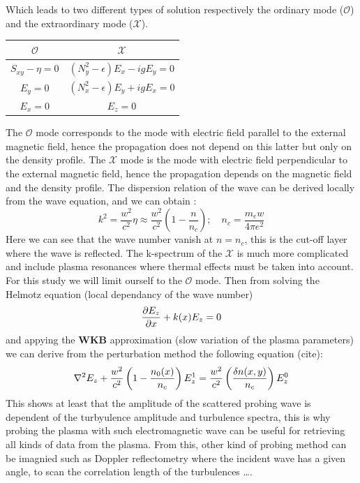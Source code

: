 \documentclass[11pt,a4paper]{report}
\begin{document}
\begin{multicols}{2}
    Which leads to two different types of solution respectively the ordinary mode ($\mathcal{O}$) and the extraordinary mode ($\mathcal{X}$).
    \setlength{\tabcolsep}{18pt}
    \renewcommand{\arraystretch}{1.5}
    \begin{center}
        \begin{tabular}{|| c  | c||}
            \hline
            $\mathcal{O}$       & $\mathcal{X}$                       \\
            \hline\hline
            $S_{xy} - \eta = 0$ & $(N_y^2 - \epsilon)E_x - igE_y = 0$ \\
            $E_y = 0$           & $(N_x^2 - \epsilon)E_y + igE_x = 0$ \\
            $E_x = 0$           & $E_z = 0$                           \\
            \hline
        \end{tabular}
    \end{center}
    The $\mathcal{O}$ mode corresponds to the mode with electric field parallel to the external magnetic field, hence the propagation does not depend on this latter but only on the density profile. The $\mathcal{X}$ mode is the mode with electric field perpendicular to the external magnetic field, hence the propagation depends on the magnetic field and the density profile. The dispersion relation of the wave can be derived locally from the wave equation, and we can obtain :
    $$k^2 = \frac{w^2}{c^2} \eta \approx \frac{w^2}{c^2}\left(1 - \frac{n}{n_c}\right); \quad n_c = \frac{m_ew}{4 \pi e^2} $$
    Here we can see that the wave number vanish at $n = n_c$, this is the cut-off layer where the wave is reflected.
    The k-spectrum of the $\mathcal{X}$ is much more complicated and include plasma resonances where thermal effects must be taken into account. For this study we will limit ourself to the $\mathcal{O}$ mode. Then from solving the Helmotz equation (local dependancy of the wave number) $$\pdv{E_z}{x} + k(x)E_z = 0$$ and appying the \textbf{WKB} approximation (slow variation of the plasma parameters) we can derive from the perturbation method the following equation (cite):
    $$ \laplacian E_z  + \frac{w^2}{c^2}\left(1 - \frac{n_0(x)}{n_c}\right)E^1_z =  \frac{w^2}{c^2}\left(\frac{\delta n(x,y)}{n_c}\right)E^0_z $$
    This shows at least that the amplitude of the scattered probing wave is dependent of the turbyulence amplitude and turbulence spectra, this is why probing the plasma with such electromagnetic wave can be useful for retrieving all kinds of data from the plasma. From this, other kind of probing method can be imagnied such as Doppler reflectometry where the incident wave has a given angle, to scan the correlation length of the turbulences \dots.
\end{multicols}
\end{document}
